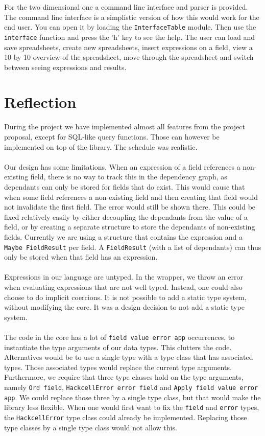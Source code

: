 \documentclass{article}
\begin{document}
	For the two dimensional one a command line interface and parser is provided. The command line interface is a simplistic version of how this would work for the end user. You can open it by loading the \texttt{InterfaceTable} module. Then use the \texttt{interface} function and press the 'h' key to see the help. The user can load and save spreadsheets, create new spreadsheets, insert expressions on a field, view a 10 by 10 overview of the spreadsheet, move through the spreadsheet and switch between seeing expressions and results. 
	\section{Reflection}
	During the project we have implemented almost all features from the project proposal, except for SQL-like query functions. Those can however be implemented on top of the library. The schedule was realistic.
\\\\	
	Our design has some limitations. When an expression of a field references a non-existing field, there is no way to track this in the dependency graph, as dependants can only be stored for fields that do exist. This would cause that when some field references a non-existing field and then creating that field would not invalidate the first field. The error would still be shown there. This could be fixed relatively easily by either decoupling the dependants from the value of a field, or by creating a separate structure to store the dependants of non-existing fields. Currently we are using a structure that contains the expression and a \texttt{Maybe FieldResult} per field. A \texttt{FieldResult} (with a list of dependants) can thus only be stored when that field has an expression.
\\\\	
	Expressions in our language are untyped. In the wrapper, we throw an error when evaluating expressions that are not well typed. Instead, one could also choose to do implicit coercions. It is not possible to add a static type system, without modifying the core. It was a design decision to not add a static type system.
\\\\
	The code in the core has a lot of \texttt{field value error app} occurrences, to instantiate the type arguments of our data types. This clutters the code. Alternatives would be to use a single type with a type class that has associated types. Those associated types would replace the current type arguments. Furthermore, we require that three type classes hold on the type arguments, namely \texttt{Ord field}, \texttt{HackcellError error field} and \texttt{Apply field value error app}. We could replace those three by a single type class, but that would make the library less flexible. When one would first want to fix the \texttt{field} and \texttt{error} types, the \texttt{HackcellError} type class could already be implemented. Replacing those type classes by a single type class would not allow this.
\end{document}

